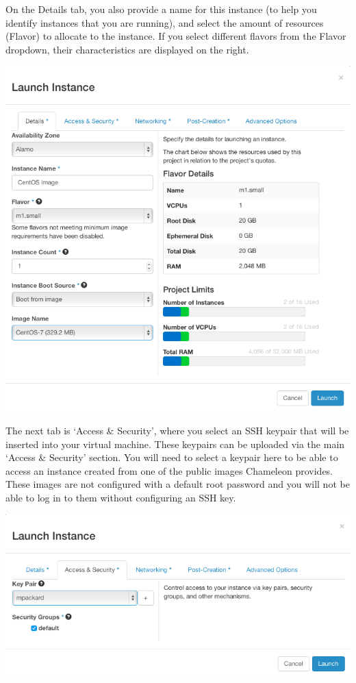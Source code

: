 On the Details tab, you also provide a name for this instance (to help
you identify instances that you are running), and select the amount of
resources (Flavor) to allocate to the instance. If you select different
flavors from the Flavor dropdown, their characteristics are displayed on
the right.

\includegraphics[width=0.8\columnwidth]{images/chameleon/openstack_alamo_launch_details.png}

The next tab is `Access \& Security', where you select an SSH keypair
that will be inserted into your virtual machine. These keypairs can be
uploaded via the main `Access \& Security' section. You will need to
select a keypair here to be able to access an instance created from one
of the public images Chameleon provides. These images are not configured
with a default root password and you will not be able to log in to them
without configuring an SSH key.

\includegraphics[width=0.8\columnwidth]{images/chameleon/openstack_alamo_launch_access.png}

